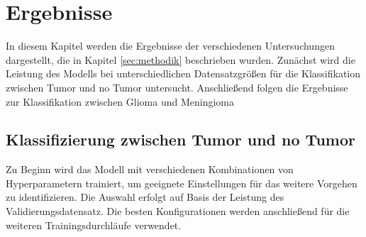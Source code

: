 \chapter{Ergebnisse}
In diesem Kapitel werden die Ergebnisse der verschiedenen Untersuchungen dargestellt, die in Kapitel \ref{sec:methodik} beschrieben wurden.
Zunächst wird die Leistung des Modells bei unterschiedlichen Datensatzgrößen für die Klassifikation zwischen Tumor und no Tumor untersucht.
Anschließend folgen die Ergebnisse zur Klassifikation zwischen Glioma und Meningioma

\section{Klassifizierung zwischen Tumor und no Tumor}
Zu Beginn wird das Modell mit verschiedenen Kombinationen von Hyperparametern trainiert, um geeignete Einstellungen für das weitere Vorgehen zu identifizieren.
Die Auswahl erfolgt auf Basis der Leistung des Validierungsdatensatz.
Die besten Konfigurationen werden anschließend für die weiteren Trainingsdurchläufe verwendet.

